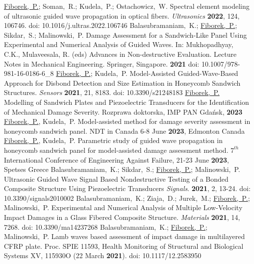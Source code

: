 \documentclass[a4paper,11pt]{article}
\begin{document}
\begin{thebibliography}{99}
 \underline{Fiborek,~P.}; Soman,~R.; Kudela,~P.; 		Ostachowicz,~W. Spectral element modeling of ultrasonic guided wave propagation in optical fibers. \textit{Ultrasonics} \textbf{2022}, 124, 106746. doi: 10.1016/j.ultras.2022.106746
 Balasubramaniam,~K.; \underline{Fiborek,~P.}; 	Sikdar,~S.; Malinowski,~P. Damage Assessment for a Sandwich-Like Panel Using Experimental and Numerical Analysis of Guided Waves. In: Mukhopadhyay, C.K., Mulaveesala, R. (eds) Advances in Non-destructive Evaluation. Lecture Notes in Mechanical Engineering. Springer, Singapore. \textbf{2021} doi: 10.1007/978-981-16-0186-6\_8
 \underline{Fiborek,~P.}; Kudela,~P. Model-Assisted 	Guided-Wave-Based Approach for Disbond	Detection and Size Estimation in Honeycomb Sandwich Structures. \textit{Sensors} \textbf{2021}, 21, 8183. doi: 10.3390/s21248183
 \underline{Fiborek,~P.} Modelling of Sandwich Plates and Piezoelectric Transducers for the Identification of Mechanical Damage Severity. Rozprawa doktorska, IMP PAN Gdańsk, \textbf{2023}
 \underline{Fiborek,~P.}, Kudela,~P. Model-assisted method for damage severity assessment in honeycomb sandwich panel. NDT in Canada 6-8 June \textbf{2023}, Edmonton Canada
 \underline{Fiborek,~P.}, Kudela,~P. Parametric study of guided wave propagation in honeycomb sandwich panel for model-assisted damage assessment method. \(7^{th}\) International Conference of Engineering Against Failure, 21-23 June \textbf{2023}, Spetses Greece
 Balasubramaniam,~K.; Sikdar,~S.; \underline{Fiborek,~P.}; Malinowski,~P. Ultrasonic Guided Wave Signal Based Nondestructive Testing of a Bonded Composite Structure Using Piezoelectric Transducers \textit{Signals}. \textbf{2021}, 2, 13-24. doi: 10.3390/signals2010002
 Balasubramaniam,~K.; Ziaja,~D.; Jurek,~M.; \underline{Fiborek,~P.}; Malinowski,~P. Experimental and Numerical Analysis of Multiple	Low-Velocity Impact Damages in a Glass Fibered Composite Structure. \textit{Materials} \textbf{2021}, 14, 7268. doi: 10.3390/ma14237268
 Balasubramaniam,~K.; \underline{Fiborek,~P.}; Malinowski,~P. Lamb waves based assessment of impact damage in multilayered CFRP plate. Proc. SPIE 11593, Health Monitoring of Structural and Biological Systems XV, 115930O (22 March \textbf{2021}). doi: 10.1117/12.2583950
\end{thebibliography}
\end{document}
